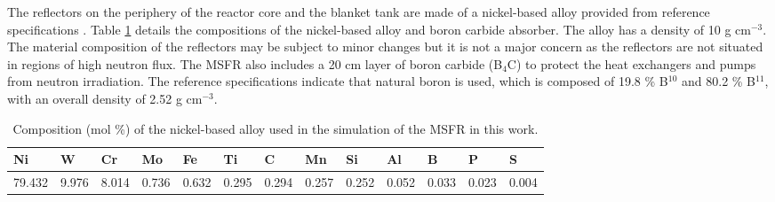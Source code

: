 The reflectors on the periphery of the reactor core and the blanket tank are
made of a nickel-based alloy provided from reference specifications
\cite{delpech_reactor_2009}. Table \ref{table:refl} details the compositions
of the nickel-based alloy and boron carbide absorber. The alloy has a density
of 10 g cm$^{-3}$. The material composition of the reflectors may be subject
to minor changes but it is not a major concern as the reflectors are not
situated in regions of high neutron flux. The \gls{MSFR} also includes a 20 cm
layer of boron carbide (B$_4$C) to protect the heat exchangers and pumps from
neutron irradiation. The reference specifications indicate that natural boron
is used, which is composed of 19.8 \% B$^{10}$ and 80.2 \% B$^{11}$, with an
overall density of 2.52 g cm$^{-3}$. 
%
\begin{table}[htb!]
\small
\centering
\caption{Composition (mol \%) of the nickel-based alloy used in the simulation
of the \gls{MSFR} in this work.}
\begin{tabular}{l l l l l l l l l l l l l}
\toprule
Ni & W & Cr & Mo & Fe & Ti & C & Mn & Si & Al & B & P & S \\
\midrule
79.432 & 9.976 & 8.014 & 0.736 & 0.632 & 0.295 & 0.294 & 0.257 & 0.252 & 0.052 & 0.033 & 0.023 & 0.004 \\
\bottomrule
\end{tabular}
\label{table:refl}
\end{table}
